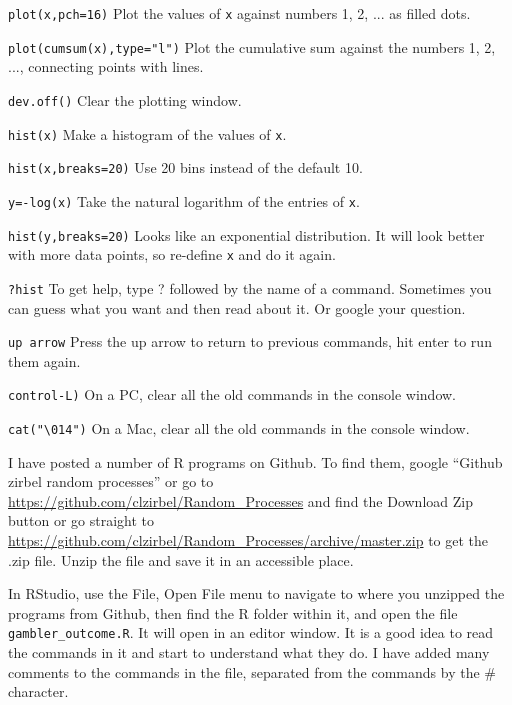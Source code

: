 \item {\tt plot(x,pch=16)} \hfill Plot the values of {\tt x} against numbers 1, 2, ... as filled dots.
\item {\tt plot(cumsum(x),type="l")} \hfill Plot the cumulative sum against the numbers 1, 2, ..., \new connecting points with lines.
\item {\tt dev.off()} \hfill Clear the plotting window.
\item {\tt hist(x)} \hfill Make a histogram of the values of {\tt x}.
\item {\tt hist(x,breaks=20)} \hfill Use 20 bins instead of the default 10.
\item {\tt y=-log(x)} \hfill Take the natural logarithm of the entries of
{\tt x}.
\item {\tt hist(y,breaks=20)} \hfill Looks like an exponential distribution.  It will look better \new with more data points, so re-define {\tt x} and do it again.

\item {\tt ?hist} \hfill To get help, type ? followed by the name of a command.  Sometimes \new you can guess what you want and then read about it.  Or google your question.

\item {\tt up arrow} \hfill Press the up arrow to return to previous commands, hit enter to run them again.
\item {\tt control-L)} \hfill On a PC, clear all the old commands in the console window.
\item {\tt cat("\textbackslash 014")} \hfill On a Mac, clear all the old commands in the console window.

\item I have posted a number of R programs on Github.  To find them, google ``Github zirbel random processes'' or go to \url{https://github.com/clzirbel/Random\_Processes} and find the Download Zip button or go straight to \url{https://github.com/clzirbel/Random\_Processes/archive/master.zip} to get the .zip file.
Unzip the file and save it in an accessible place.

\item In RStudio, use the File, Open File menu to navigate to where you unzipped the programs from Github, then find the R folder within it, and open the file {\tt gambler\_outcome.R}.  It will open in an editor window.  It is a good idea to read the commands in it and start to understand what they do.  I have added many comments to the commands in the file, separated from the commands by the \# character.

